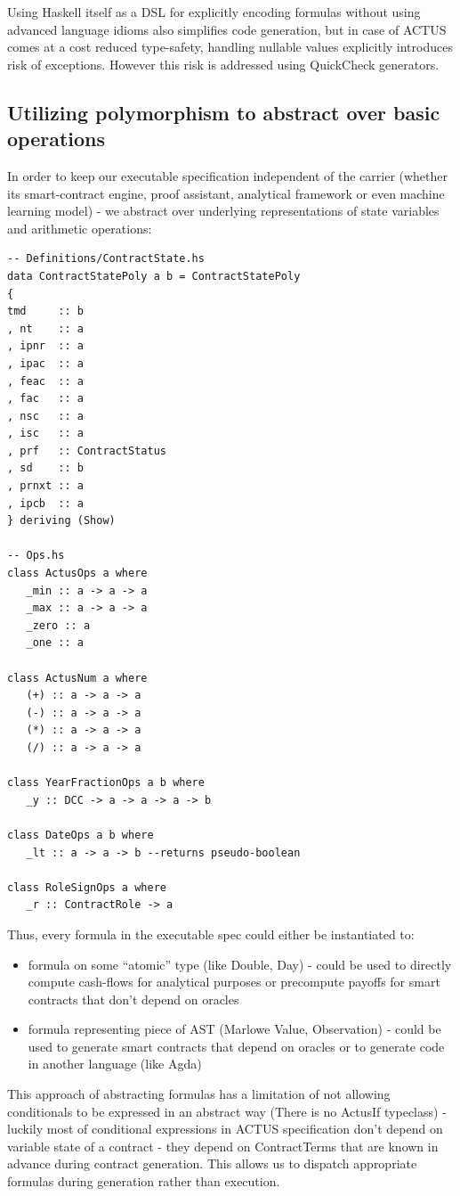 \documentclass[runningheads]{llncs}
\begin{document}
Using Haskell itself as a DSL for explicitly encoding formulas without
using advanced language idioms also simplifies code generation, but
in case of ACTUS comes at a cost reduced type-safety, handling nullable
values explicitly introduces risk of exceptions. However this risk
is addressed using QuickCheck generators.

\subsection{Utilizing polymorphism to abstract over basic operations}

In order to keep our executable specification independent of the carrier
(whether its smart-contract engine, proof assistant, analytical framework
or even machine learning model) - we abstract over underlying representations
of state variables and arithmetic operations:

\begin{verbatim}
-- Definitions/ContractState.hs 
data ContractStatePoly a b = ContractStatePoly  
{  
tmd     :: b  
, nt    :: a  
, ipnr  :: a  
, ipac  :: a  
, feac  :: a  
, fac   :: a  
, nsc   :: a  
, isc   :: a  
, prf   :: ContractStatus  
, sd    :: b  
, prnxt :: a  
, ipcb  :: a  
} deriving (Show) 

-- Ops.hs
class ActusOps a where    
   _min :: a -> a -> a
   _max :: a -> a -> a
   _zero :: a
   _one :: a

class ActusNum a where
   (+) :: a -> a -> a
   (-) :: a -> a -> a
   (*) :: a -> a -> a
   (/) :: a -> a -> a

class YearFractionOps a b where
   _y :: DCC -> a -> a -> a -> b   

class DateOps a b where
   _lt :: a -> a -> b --returns pseudo-boolean   

class RoleSignOps a where
   _r :: ContractRole -> a
\end{verbatim}

Thus, every formula in the executable spec could either be instantiated
to: 
\begin{itemize}
\item formula on some ``atomic'' type (like Double, Day) - could be used
to directly compute cash-flows for analytical purposes or precompute
payoffs for smart contracts that don't depend on oracles 
\item formula representing piece of AST (Marlowe Value, Observation) - could
be used to generate smart contracts that depend on oracles or to generate
code in another language (like Agda) 
\end{itemize}
This approach of abstracting formulas has a limitation of not allowing
conditionals to be expressed in an abstract way (There is no ActusIf
typeclass) - luckily most of conditional expressions in ACTUS specification
don't depend on variable state of a contract - they depend on ContractTerms
that are known in advance during contract generation. This allows
us to dispatch appropriate formulas during generation rather than
execution.
\end{document}
